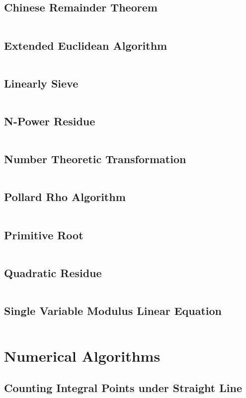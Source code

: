 \documentclass[a4paper,openany]{book}
\newcommand{\cppcode}[1]
{
  \inputminted[mathescape,
  tabsize=4,
  linenos,
  framesep=2mm,
  breakaftergroup=true,
  breakautoindent=true,
  breakbytoken=true,
  breaklines=true,
  fontsize=\small
  ]{cpp}{Source/#1}
}
\begin{document}
\section{Chinese Remainder Theorem}
\cppcode{/Number Theory/Chinese Remainder Theorem.cpp}
\section{Extended Euclidean Algorithm}
\cppcode{/Number Theory/Extended Euclidean Algorithm.cpp}
\section{Linearly Sieve}
\cppcode{/Number Theory/Linearly Sieve.cpp}
\section{N-Power Residue}
\cppcode{/Number Theory/N-Power Residue.cpp}
\section{Number Theoretic Transformation}
\cppcode{/Number Theory/Number Theoretic Transformation.cpp}
\section{Pollard Rho Algorithm}
\cppcode{/Number Theory/Pollard Rho Algorithm.cpp}
\section{Primitive Root}
\cppcode{/Number Theory/Primitive Root.cpp}
\section{Quadratic Residue}
\cppcode{/Number Theory/Quadratic Residue.cpp}
\section{Single Variable Modulus Linear Equation}
\cppcode{/Number Theory/Single Variable Modulus Linear Equation.cpp}

\chapter{Numerical Algorithms}
\section{Counting Integral Points under Straight Line}
\cppcode{/Numerical Algorithms/Counting Integral Points under Straight Line.cpp}
\end{document}
